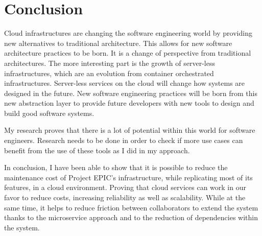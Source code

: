 \chapter{Conclusion}
\OnePageChapter

Cloud infrastructures are changing the software engineering world by providing new alternatives to traditional architecture. This allows for new software architecture practices to be born. It is a change of perspective from traditional architectures. The more interesting part is the growth of server-less infrastructures, which are an evolution from container orchestrated infrastructures. Server-less services on the cloud will change how systems are designed in the future. New software engineering practices will be born from this new abstraction layer to provide future developers with new tools to design and build good software systems.

My research proves that there is a lot of potential within this world for software engineers. Research needs to be done in order to check if more use cases can benefit from the use of these tools as I did in my approach. 

In conclusion, I have been able to show that it is possible to reduce the maintenance cost of Project EPIC’s infrastructure, while replicating most of its features, in a cloud environment. Proving that cloud services can work in our favor to reduce costs, increasing reliability as well as scalability. While at the same time, it helps to reduce friction between collaborators to extend the system thanks to the microservice approach and to the reduction of dependencies within the system.
